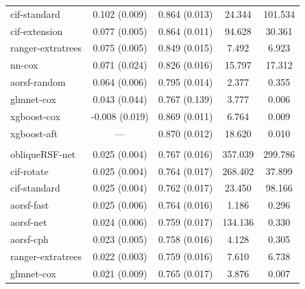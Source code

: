 \documentclass{article}\usepackage[]{graphicx}\usepackage[]{xcolor}
\newenvironment{knitrout}{}{} %
\begin{document}
\begin{knitrout}
\begin{longtable}[t]{lcccc}
\hspace{1em}cif-standard & 0.102 (0.009) & 0.864 (0.013) & 24.344 & 101.534\\
\hspace{1em}cif-extension & 0.077 (0.005) & 0.864 (0.011) & 94.628 & 30.361\\
\hspace{1em}ranger-extratrees & 0.075 (0.005) & 0.849 (0.015) & 7.492 & 6.923\\
\hspace{1em}nn-cox & 0.071 (0.024) & 0.826 (0.016) & 15.797 & 17.312\\
\hspace{1em}aorsf-random & 0.064 (0.006) & 0.795 (0.014) & 2.377 & 0.355\\
\hspace{1em}glmnet-cox & 0.043 (0.044) & 0.767 (0.139) & 3.777 & 0.006\\
\hspace{1em}xgboost-cox & -0.008 (0.019) & 0.869 (0.011) & 6.764 & 0.009\\
\hspace{1em}xgboost-aft & --- & 0.870 (0.012) & 18.620 & 0.010\\
\addlinespace[0.3em]
\multicolumn{5}{l}{\textit{\textbf{MESA; stroke, n = 6783, p = 48}}}\\
\hline
\hspace{1em}obliqueRSF-net & 0.025 (0.004) & 0.767 (0.016) & 357.039 & 299.786\\
\hspace{1em}cif-rotate & 0.025 (0.004) & 0.764 (0.017) & 268.402 & 37.899\\
\hspace{1em}cif-standard & 0.025 (0.004) & 0.762 (0.017) & 23.450 & 98.166\\
\hspace{1em}aorsf-fast & 0.025 (0.006) & 0.764 (0.016) & 1.186 & 0.296\\
\hspace{1em}aorsf-net & 0.024 (0.006) & 0.759 (0.017) & 134.136 & 0.330\\
\hspace{1em}aorsf-cph & 0.023 (0.005) & 0.758 (0.016) & 4.128 & 0.305\\
\hspace{1em}ranger-extratrees & 0.022 (0.003) & 0.759 (0.016) & 7.610 & 6.738\\
\hspace{1em}glmnet-cox & 0.021 (0.009) & 0.765 (0.017) & 3.876 & 0.007\\

\end{longtable}
\end{knitrout}
\end{document}
